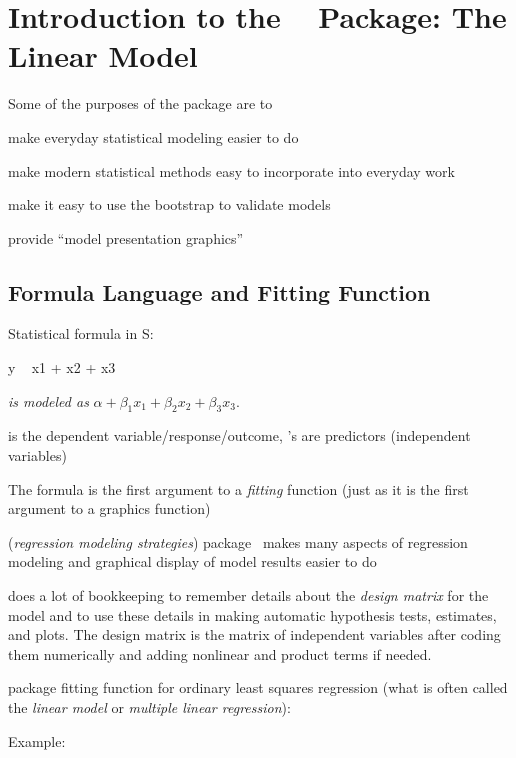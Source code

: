 

\def\apacue{1}
\chapter{Introduction to the \R\  Package:
  The Linear Model}
Some of the purposes of the  package are to
\bi
\item make everyday statistical modeling easier to do
\item make modern statistical methods easy to incorporate into everyday work
\item make it easy to use the bootstrap to validate models
\item provide ``model presentation graphics''
\ei
  
\section{Formula Language and Fitting Function}%
\bi
\item Statistical formula in S:
\begin{Schunk}
\begin{Sinput}
y ~ x1 + x2 + x3
\end{Sinput}
\end{Schunk}
 \emph{is modeled as} $\alpha + \beta_{1}x_{1} + \beta_{2}x_{2}
+ \beta_{3} x_{3}$.
\item {} is the dependent variable/response/outcome, 's are
  predictors (independent variables)
\item The formula is the first argument to a \emph{fitting}
  function (just as it is the first argument to a 
  graphics function)
\item {} (\emph{regression modeling strategies}) package~\cite{rrms}
  makes many aspects of regression modeling
  and graphical display of model results easier to do
\item {} does a lot of bookkeeping to
  remember details about the \emph{design matrix} for the model and to
  use these details in making automatic hypothesis tests, estimates,
  and plots.  The design matrix is the matrix of independent variables
  after coding them numerically and adding nonlinear and product terms
  if needed.
\item {} package fitting function for ordinary least squares
  regression (what is often called the \emph{linear model} or
  \emph{multiple linear regression}): 
\item Example:\ipacue

